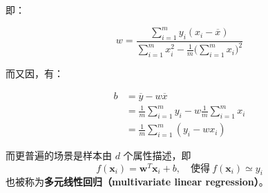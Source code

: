 \documentclass[../studies-ml.tex]{subfiles}
\begin{document}
即：

\begin{equation}
  w = \frac{\sum\limits_{i=1}^{m} y_i(x_i - \overline{x})}{\sum\limits_{i=1}^{m} x_i^2 - \frac{1}{m}\biggl(\sum\limits_{i=1}^{m}x_i\biggr)^2}
\end{equation}

而又因，有：

\begin{equation}
  \begin{split}
    b & = \overline{y} - w\overline{x} \\
    & = \frac{1}{m}\sum_{i=1}^{m} y_i - w\frac{1}{m}\sum_{i=1}^{m} x_i \\
    & = \frac{1}{m}\sum_{i=1}^{m} (y_i - w x_i)
  \end{split}
\end{equation}

而更普遍的场景是样本由 $d$ 个属性描述，即
\[
  f(\pmb{x}_i) = \pmb{w}^T \pmb{x}_i + b, \quad \text{使得}\ f(\pmb{x}_i) \simeq y_i
\]
也被称为\textbf{多元线性回归（multivariate linear regression）}。

\bigbreak
\end{document}
